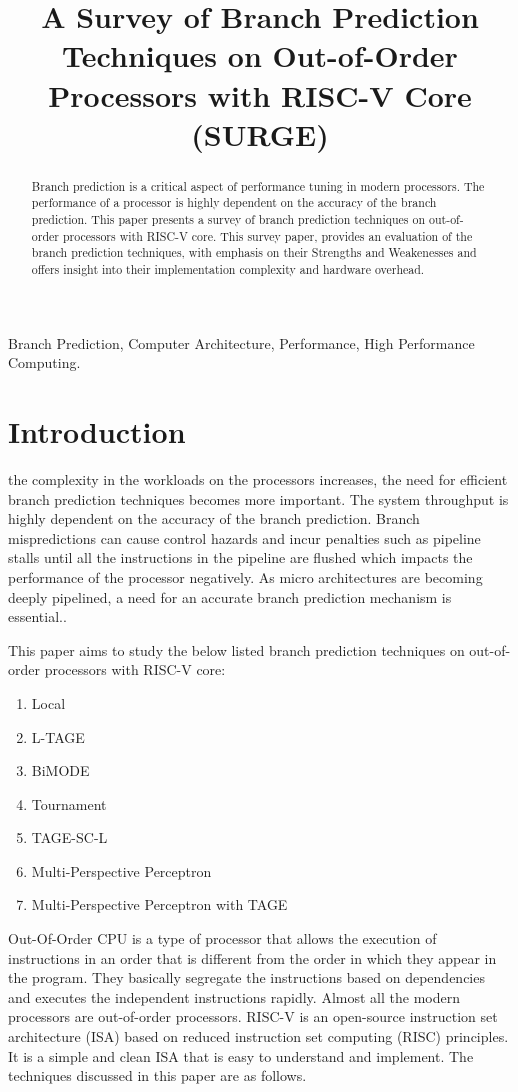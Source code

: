 \documentclass[10pt,journal,compsoc]{IEEEtran}
\begin{document}
\title{A Survey of Branch Prediction Techniques on Out-of-Order Processors with RISC-V Core (SURGE)}
\author{
}
\maketitle
\begin{abstract}
    Branch prediction is a critical aspect of performance tuning in modern processors. 
    The performance of a processor is highly dependent on the accuracy of the branch prediction.
    This paper presents a survey of branch prediction techniques on out-of-order processors with RISC-V core.
    This survey paper, provides an evaluation of the branch prediction techniques, with emphasis on their Strengths and Weakenesses and 
    offers insight into their implementation complexity and hardware overhead.
\end{abstract}
\begin{IEEEkeywords}
Branch Prediction, Computer Architecture, Performance, High Performance Computing.
\end{IEEEkeywords}
\section{Introduction}
 the complexity in the workloads on the processors increases, the 
need for efficient branch prediction techniques becomes more important. The system throughput is 
highly dependent on the accuracy of the branch prediction. Branch mispredictions can cause control hazards 
and incur penalties such as pipeline stalls until all the instructions in the pipeline are flushed which impacts
the performance of the processor negatively. As micro architectures are becoming deeply pipelined, a need for an accurate branch prediction mechanism is essential.\cite{1003559}.

This paper aims to study the below listed branch prediction techniques on out-of-order processors with RISC-V core:
\begin{enumerate}
    \item Local
    \item L-TAGE
    \item BiMODE
    \item Tournament
    \item TAGE-SC-L
    \item Multi-Perspective Perceptron
    \item Multi-Perspective Perceptron with TAGE
\end{enumerate}
Out-Of-Order CPU is a type of processor that allows the execution of instructions in an order that is different from the order in which they appear in the program.
They basically segregate the instructions based on dependencies and executes the independent instructions rapidly. Almost all the modern processors are out-of-order processors.
RISC-V is an open-source instruction set architecture (ISA) based on reduced instruction set computing (RISC) principles. It is a simple and clean ISA that is easy to understand and implement.
The techniques discussed in this paper are as follows.
\end{document}

